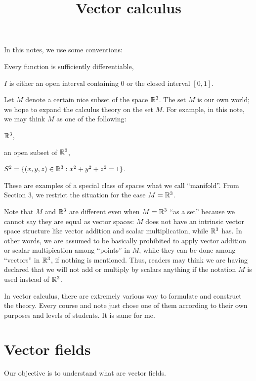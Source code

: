 \documentclass{../exp}
\title{Vector calculus}
\begin{document}
\maketitle
\tableofcontents

In this notes, we use some conventions:
\begin{cond}
\item Every function is sufficiently differentiable,
\item $I$ is either an open interval containing 0 or the closed interval $[0,1]$.
\end{cond}

Let $M$ denote a certain nice subset of the space $\mathbb{R}^3$.
The set $M$ is our own world; we hope to expand the calculus theory on the set $M$. 
For example, in this note, we may think $M$ as one of the following:
\begin{cond}
\item $\mathbb{R}^3$,
\item an open subset of $\mathbb{R}^3$,
\item $S^2=\{(x,y,z)\in\mathbb{R}^3:x^2+y^2+z^2=1\}$.
\end{cond}
These are examples of a special class of spaces what we call ``manifold''.
From Section 3, we restrict the situation for the case $M=\mathbb{R}^3$.

Note that $M$ and $\mathbb{R}^3$ are different even when $M=\mathbb{R}^3$ ``as a set'' because we cannot say they are equal as vector spaces: $M$ does not have an intrinsic vector space structure like vector addition and scalar multiplication, while $\mathbb{R}^3$ has.
In other words, we are assumed to be basically prohibited to apply vector addition or scalar multipication among ``points'' in $M$, while they can be done among ``vectors'' in $\mathbb{R}^3$, if nothing is mentioned.
Thus, readers may think we are having declared that we will not add or multiply by scalars anything if the notation $M$ is used instead of $\mathbb{R}^3$.

In vector calculus, there are extremely various way to formulate and construct the theory.
Every course and note just chose one of them according to their own purposes and levels of students.
It is same for me.







\section{Vector fields}
Our objective is to understand what are vector fields.
\end{document}
